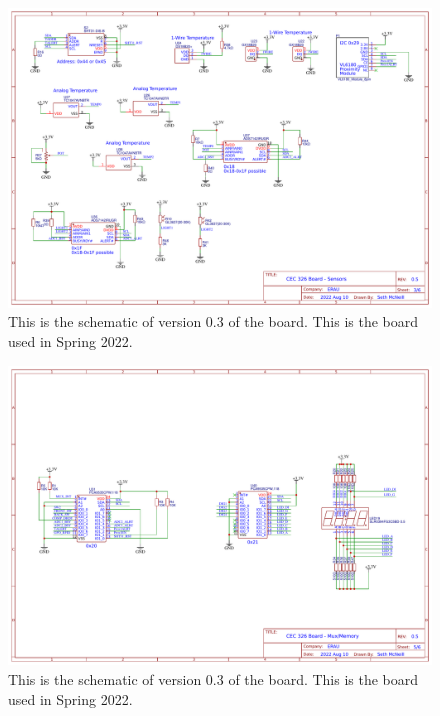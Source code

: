\begin{landscape}
\begin{figure}[!htb]
	\centering
	\includegraphics[width=\paperwidth]{arduinoStart/Schematic_CEC326v0.5_Sensors} %
	\caption{This is the schematic of version 0.3 of the board. This is the board used in Spring 2022.}
	\label{fig:boardSchematic}
\end{figure} 

\begin{figure}[!htb]
	\centering
	\includegraphics[width=\paperwidth]{arduinoStart/Schematic_CEC326v0.5_Mux} %
	\caption{This is the schematic of version 0.3 of the board. This is the board used in Spring 2022.}
	\label{fig:boardSchematic}
\end{figure} 


\end{landscape}
